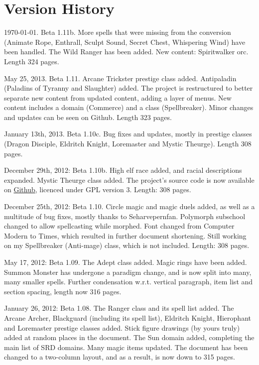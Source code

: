 \section{Version History}
\begin{list}{}{\leftmargin=1em}
 \item \today. Beta 1.11b. More spells that were missing from the conversion (Animate Rope, Enthrall, Sculpt Sound, Secret Chest, Whispering Wind) have been handled. The Wild Ranger has been added. New content: Spiritwalker orc. Length 324 pages.
 \item May 25, 2013. Beta 1.11. Arcane Trickster prestige class added. Antipaladin (Paladins of Tyranny and Slaughter) added. The project is restructured to better separate new content from updated content, adding a layer of menus. New content includes a domain (Commerce) and a class (Spellbreaker). Minor changes and updates can be seen on Github. Length 323 pages.
 \item January 13th, 2013. Beta 1.10c. Bug fixes and updates, mostly in prestige classes (Dragon Disciple, Eldritch Knight, Loremaster and Mystic Theurge). Length 308 pages.
 \item December 29th, 2012: Beta 1.10b. High elf race added, and racial descriptions expanded. Mystic Theurge class added. The project's source code is now available on \href{https://github.com/Ernir/VancianToPsionics}{Github}, licenced under GPL version 3. Length: 308 pages.
 \item December 25th, 2012: Beta 1.10. Circle magic and magic duels added, as well as a multitude of bug fixes, mostly thanks to Seharvepernfan. Polymorph subschool changed to allow spellcasting while morphed. Font changed from Computer Modern to Times, which resulted in further document shortening. Still working on my Spellbreaker (Anti-mage) class, which is not included. Length: 308 pages.
 \item May 17, 2012: Beta 1.09. The Adept class added. Magic rings have been added. Summon Monster has undergone a paradigm change, and is now split into many, many smaller spells. Further condensation w.r.t. vertical paragraph, item list and section spacing, length now 316 pages.
 \item January 26, 2012: Beta 1.08. The Ranger class and its spell list added. The Arcane Archer, Blackguard (including its spell list), Eldritch Knight, Hierophant and Loremaster prestige classes added. Stick figure drawings (by yours truly) added at random places in the document. The Sun domain added, completing the main list of SRD domains. Many magic items updated. The document has been changed to a two-column layout, and as a result, is now down to 315 pages.

\end{list}
